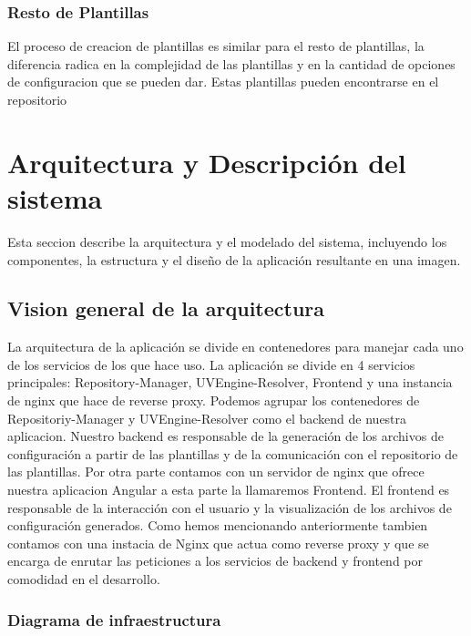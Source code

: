 \documentclass[12pt, a4paper, twoside]{article}
\begin{document}
\newpage
\subsubsection{Resto de Plantillas}
El proceso de creacion de plantillas es similar para el resto de plantillas, la diferencia radica en la complejidad de las plantillas y en la cantidad de opciones de configuracion que se pueden dar.
Estas plantillas pueden encontrarse en el repositorio \cite{m4rdom_templates}














\section{Arquitectura y Descripción del sistema }
\label{sec:Arquitectura y Descripción del sistema}
Esta seccion describe la arquitectura y el modelado del sistema, incluyendo los componentes, la estructura y el diseño de la aplicación resultante en una imagen.
\subsection{Vision general de la arquitectura }
La arquitectura de la aplicación se divide en contenedores para manejar cada uno de los servicios de los que hace uso.
La aplicación se divide en 4 servicios principales: Repository-Manager, UVEngine-Resolver, Frontend y una instancia de nginx que hace de reverse proxy.
Podemos agrupar los contenedores de Repositoriy-Manager y UVEngine-Resolver como el backend de nuestra aplicacion.
Nuestro backend es responsable de la generación de los archivos de configuración a partir de las plantillas y de la comunicación con el repositorio de las plantillas.
Por otra parte contamos con un servidor de nginx que ofrece nuestra aplicacion Angular a esta parte la llamaremos Frontend.
El frontend es responsable de la interacción con el usuario y la visualización de los archivos de configuración generados.
Como hemos mencionando anteriormente tambien contamos con una instacia de Nginx que actua como reverse proxy y que se encarga de enrutar las peticiones a los servicios de backend y frontend por comodidad en el desarrollo. 

\newpage 
\subsubsection{Diagrama de infraestructura}
\end{document}
